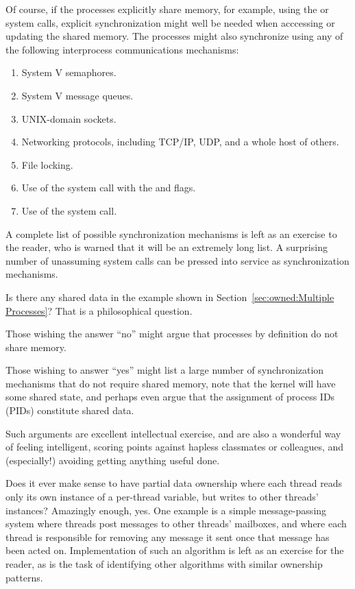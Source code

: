 	Of course, if the processes explicitly share memory, for
	example, using the  or  system
	calls, explicit synchronization might well be needed when
	acccessing or updating the shared memory.
	The processes might also synchronize using any of the following
	interprocess communications mechanisms:
	\begin{enumerate}
	\item	System V semaphores.
	\item	System V message queues.
	\item	UNIX-domain sockets.
	\item	Networking protocols, including TCP/IP, UDP, and a whole
		host of others.
	\item	File locking.
	\item	Use of the  system call with the
		 and  flags.
	\item	Use of the  system call.
	\end{enumerate}
	A complete list of possible synchronization mechanisms is left
	as an exercise to the reader, who is warned that it will be
	an extremely long list.
	A surprising number of unassuming system calls can be pressed
	into service as synchronization mechanisms.

\QuickQ{}
	Is there any shared data in the example shown in
	Section~\ref{sec:owned:Multiple Processes}?
\QuickA{}
	That is a philosophical question.

	Those wishing the answer ``no'' might argue that processes by
	definition do not share memory.

	Those wishing to answer ``yes'' might list a large number of
	synchronization mechanisms that do not require shared memory,
	note that the kernel will have some shared state, and perhaps
	even argue that the assignment of process IDs (PIDs) constitute
	shared data.

	Such arguments are excellent intellectual exercise, and are
	also a wonderful way of feeling intelligent, scoring points
	against hapless classmates or colleagues,
	and (especially!) avoiding getting anything useful done.

\QuickQ{}
	Does it ever make sense to have partial data ownership where
	each thread reads only its own instance of a per-thread variable,
	but writes to other threads' instances?
\QuickA{}
	Amazingly enough, yes.
	One example is a simple message-passing system where threads post
	messages to other threads' mailboxes, and where each thread
	is responsible for removing any message it sent once that message
	has been acted on.
	Implementation of such an algorithm is left as an exercise for the
	reader, as is the task of identifying other algorithms with
	similar ownership patterns.


